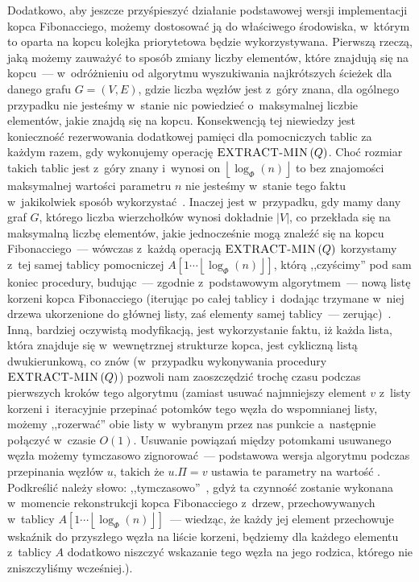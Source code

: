Dodatkowo, aby jeszcze przyśpieszyć działanie podstawowej wersji implementacji kopca Fibonacciego, możemy dostosować ją do właściwego środowiska, w~którym to oparta na kopcu kolejka priorytetowa będzie wykorzystywana. Pierwszą rzeczą, jaką możemy zauważyć to sposób zmiany liczby elementów, które znajdują się na kopcu~--- w~odróżnieniu od algorytmu wyszukiwania najkrótszych ścieżek dla danego grafu $ G = \left( V, E \right)$, gdzie liczba węzłów jest z~góry znana, dla ogólnego przypadku nie jesteśmy w~stanie nic powiedzieć o~maksymalnej liczbie elementów, jakie znajdą się na kopcu. Konsekwencją tej niewiedzy jest konieczność rezerwowania dodatkowej pamięci dla pomocniczych tablic za każdym razem, gdy wykonujemy operację $\textrm{\textsc{EXTRACT-MIN}} \left( Q \right)$. Choć rozmiar takich tablic jest z~góry znany i~wynosi on $ \left \lfloor \log_{\Phi} \left( n \right) \right \rfloor $ to bez znajomości maksymalnej wartości parametru $n$ nie jesteśmy w~stanie tego faktu w~jakikolwiek sposób wykorzystać~\cite[$19.4$]{Cormen}. Inaczej jest w~przypadku, gdy mamy dany graf $G$, którego liczba wierzchołków wynosi dokładnie $ \left| V \right|$, co przekłada się na maksymalną liczbę elementów, jakie jednocześnie mogą znaleźć się na kopcu Fibonacciego~--- wówczas z~każdą operacją $\textrm{\textsc{EXTRACT-MIN}} \left( Q \right)$ korzystamy z~tej samej tablicy pomocniczej $A \left[ 1 \cdots \left \lfloor \log_{\Phi} \left( n \right) \right \rfloor \right]$, którą ,,czyścimy'' pod sam koniec procedury, budując~--- zgodnie z~podstawowym algorytmem~--- nową listę korzeni kopca Fibonacciego (iterując po całej tablicy i~dodając trzymane w~niej drzewa ukorzenione do głównej listy, zaś elementy samej tablicy~--- zerując)~\cite[$523$--$524$]{Cormen}. Inną, bardziej oczywistą modyfikacją, jest wykorzystanie faktu, iż każda lista, która znajduje się w~wewnętrznej strukturze kopca, jest cykliczną listą dwukierunkową, co znów (w~przypadku wykonywania procedury $\textrm{\textsc{EXTRACT-MIN}} \left( Q \right)$) pozwoli nam zaoszczędzić trochę czasu podczas pierwszych kroków tego algorytmu (zamiast usuwać najmniejszy element $v$ z~listy korzeni i~iteracyjnie przepinać potomków tego węzła do wspomnianej listy, możemy ,,rozerwać'' obie listy w~wybranym przez nas punkcie a~następnie połączyć w~czasie $O \left( 1 \right)$. Usuwanie powiązań między potomkami usuwanego węzła możemy tymczasowo zignorować~--- podstawowa wersja algorytmu podczas przepinania węzłów $u$, takich że $ u.\Pi = v$ ustawia te parametry na wartość \KwNull. Podkreślić należy słowo: ,,tymczasowo''~, gdyż ta czynność zostanie wykonana w~momencie rekonstrukcji kopca Fibonacciego z~drzew, przechowywanych w~tablicy $A \left[ 1 \cdots \left \lfloor \log_{\Phi} \left( n \right) \right \rfloor \right]$~--- wiedząc, że każdy jej element przechowuje wskaźnik do przyszłego węzła na liście korzeni, będziemy dla każdego elementu z~tablicy $A$ dodatkowo niszczyć wskazanie tego węzła na jego rodzica, którego nie zniszczyliśmy wcześniej.).

